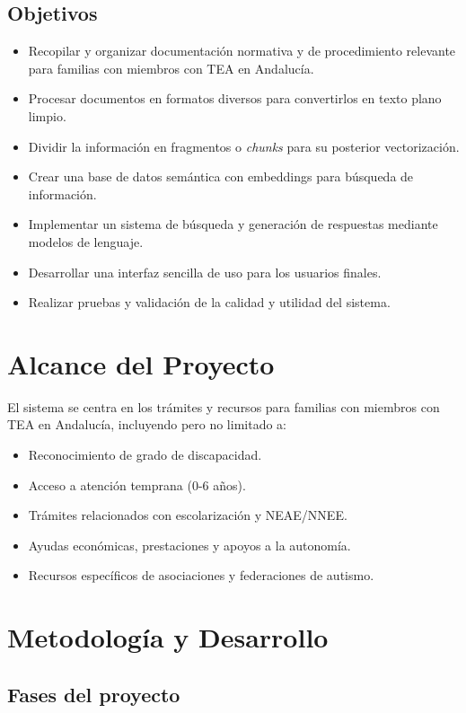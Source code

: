 \documentclass[a4paper,12pt]{article}
\begin{document}
\subsection{Objetivos}
\begin{itemize}
    \item Recopilar y organizar documentación normativa y de procedimiento relevante para familias con miembros con TEA en Andalucía.
    \item Procesar documentos en formatos diversos para convertirlos en texto plano limpio.
    \item Dividir la información en fragmentos o \textit{chunks} para su posterior vectorización.
    \item Crear una base de datos semántica con embeddings para búsqueda de información.
    \item Implementar un sistema de búsqueda y generación de respuestas mediante modelos de lenguaje.
    \item Desarrollar una interfaz sencilla de uso para los usuarios finales.
    \item Realizar pruebas y validación de la calidad y utilidad del sistema.
\end{itemize}

\section{Alcance del Proyecto}
El sistema se centra en los trámites y recursos para familias con miembros con TEA en Andalucía, incluyendo pero no limitado a:
\begin{itemize}
    \item Reconocimiento de grado de discapacidad.
    \item Acceso a atención temprana (0-6 años).
    \item Trámites relacionados con escolarización y NEAE/NNEE.
    \item Ayudas económicas, prestaciones y apoyos a la autonomía.
    \item Recursos específicos de asociaciones y federaciones de autismo.
\end{itemize}

\section{Metodología y Desarrollo}

\subsection{Fases del proyecto}
\end{document}
